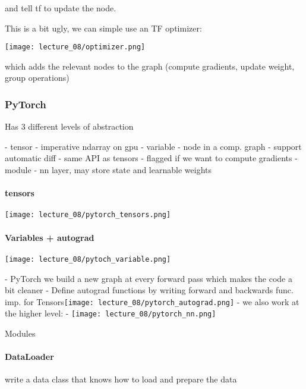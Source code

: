 and tell tf to update the node.

This is a bit ugly, we can simple use an TF optimizer: 

\texttt{[image: lecture\_08/optimizer.png]}

which adds the relevant nodes to the graph (compute gradients, update weight, group operations)

\subsubsection{PyTorch}

Has 3 different levels of abstraction

- tensor - imperative ndarray on gpu
- variable - node in a comp. graph
  - support automatic diff
  - same API as tensors
  - flagged if we want to compute gradients
- module - nn layer, may store state and learnable weights



\paragraph{tensors}

\texttt{[image: lecture\_08/pytorch\_tensors.png]}

\paragraph{Variables + autograd}

\texttt{[image: lecture\_08/pytoch\_variable.png]}

- PyTorch we build a new graph at every forward pass which makes the code a bit cleaner
- Define autograd functions by writing forward and backwards func. imp. for Tensors\texttt{[image: lecture\_08/pytorch\_autograd.png]}
- we also work at the higher level:
- \texttt{[image: lecture\_08/pytorch\_nn.png]}



Modules



\paragraph{DataLoader }

write a data class that knows how to load and prepare the data



